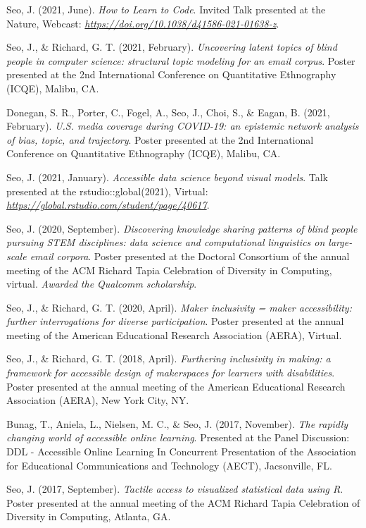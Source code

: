 \documentclass[11pt,a4paper,]{awesome-cv}
\begin{document}
Seo, J. (2021, June). \emph{How to Learn to Code}. Invited Talk
presented at the Nature, Webcast:
\emph{\url{https://doi.org/10.1038/d41586-021-01638-z}}.

Seo, J., \& Richard, G. T. (2021, February). \emph{Uncovering latent
topics of blind people in computer science: structural topic modeling
for an email corpus}. Poster presented at the 2nd International
Conference on Quantitative Ethnography (ICQE), Malibu, CA.

Donegan, S. R., Porter, C., Fogel, A., Seo, J., Choi, S., \& Eagan, B.
(2021, February). \emph{U.S. media coverage during COVID-19: an
epistemic network analysis of bias, topic, and trajectory}. Poster
presented at the 2nd International Conference on Quantitative
Ethnography (ICQE), Malibu, CA.

Seo, J. (2021, January). \emph{Accessible data science beyond visual
models}. Talk presented at the rstudio::global(2021), Virtual:
\emph{\url{https://global.rstudio.com/student/page/40617}}.

Seo, J. (2020, September). \emph{Discovering knowledge sharing patterns
of blind people pursuing STEM disciplines: data science and
computational linguistics on large-scale email corpora}. Poster
presented at the Doctoral Consortium of the annual meeting of the ACM
Richard Tapia Celebration of Diversity in Computing, virtual.
\emph{Awarded the Qualcomm scholarship}.

Seo, J., \& Richard, G. T. (2020, April). \emph{Maker inclusivity =
maker accessibility: further interrogations for diverse participation}.
Poster presented at the annual meeting of the American Educational
Research Association (AERA), Virtual.

Seo, J., \& Richard, G. T. (2018, April). \emph{Furthering inclusivity
in making: a framework for accessible design of makerspaces for learners
with disabilities}. Poster presented at the annual meeting of the
American Educational Research Association (AERA), New York City, NY.

Bunag, T., Aniela, L., Nielsen, M. C., \& Seo, J. (2017, November).
\emph{The rapidly changing world of accessible online learning}.
Presented at the Panel Discussion: DDL - Accessible Online Learning In
Concurrent Presentation of the Association for Educational
Communications and Technology (AECT), Jacsonville, FL.

Seo, J. (2017, September). \emph{Tactile access to visualized
statistical data using R}. Poster presented at the annual meeting of the
ACM Richard Tapia Celebration of Diversity in Computing, Atlanta, GA.
\end{document}
